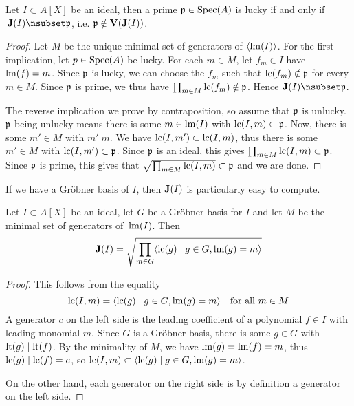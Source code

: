 \begin{lemma}\label{lem:lucky_iff_not_singular}
  Let $I \subset A[X]$ be an ideal, then a prime $\mathfrak p \in \operatorname{Spec}(A)$ is lucky if and only if $\,\J(I) \nsubset \p$, i.e. $\mathfrak p \notin \operatorname{\mathbf V}(\operatorname{\mathbf J}(I))$.
\end{lemma}
\begin{proof}
  Let $M$ be the unique minimal set of generators of $\langle \operatorname{lm}(I) \rangle$. For the first implication, let $p \in \operatorname{Spec}(A)$ be lucky. For each $m \in M$, let $f_{m} \in I$ have $\operatorname{lm}(f) = m$. Since $\mathfrak p$ is lucky, we can choose the $f_{m}$ such that $\operatorname{lc}(f_{m}) \notin \mathfrak p$ for every $m \in M$. Since $\mathfrak p$ is prime, we thus have $\prod_{m \in M} \operatorname{lc}(f_{m}) \notin \mathfrak p$. Hence $\J(I) \nsubset \p$.

  The reverse implication we prove by contraposition, so assume that $\mathfrak p$ is unlucky. $\mathfrak p$ being unlucky means there is some $m \in \operatorname{lm}(I)$ with $\operatorname{lc}(I, m) \subset \mathfrak p$. Now, there is some $m' \in M$ with $m' | m$. We have $\operatorname{lc}(I, m') \subset \operatorname{lc}(I, m)$, thus there is some $m' \in M$ with $\operatorname{lc}(I, m') \subset \mathfrak p$. Since $\mathfrak p$ is an ideal, this gives $\prod_{m \in M} \operatorname{lc}(I, m) \subset \mathfrak p$. Since $\mathfrak p$ is prime, this gives that $\sqrt{\prod_{m \in M} \operatorname{lc}(I, m)} \subset \mathfrak p$ and we are done.
\end{proof}



If we have a Gröbner basis of $I$, then $\operatorname{\mathbf J}(I)$ is particularly easy to compute.

\begin{proposition}\label{prop:singular_from_grb}
  Let $I \subset A[X]$ be an ideal, let $G$ be a Gröbner basis for $I$ and let $M$ be the minimal set of generators of $\,\operatorname{lm}(I)$. Then
  \[\operatorname{\mathbf J}(I) = \sqrt{\prod_{m \in G} \langle \operatorname{lc}(g) \mid g \in G, \operatorname{lm}(g) = m \rangle }\]
\end{proposition}
\begin{proof}
  This follows from the equality
  \[\operatorname{lc}(I, m) = \langle \operatorname{lc}(g) \mid g \in G, \operatorname{lm}(g) = m \rangle \quad \text{for all $m \in M$} \]
  A generator $c$ on the left side is the leading coefficient of a polynomial $f \in I$ with leading monomial $m$. Since $G$ is a Gröbner basis, there is some $g \in G$ with $\operatorname{lt}(g) \mid \operatorname{lt}(f)$. By the minimality of $M$, we have $\operatorname{lm}(g) = \operatorname{lm}(f) = m$, thus $\operatorname{lc}(g) \mid \operatorname{lc}(f) = c$, so $\operatorname{lc}(I, m) \subset \langle \operatorname{lc}(g) \mid g \in G, \operatorname{lm}(g) = m \rangle$.

  On the other hand, each generator on the right side is by definition a generator on the left side.
\end{proof}

